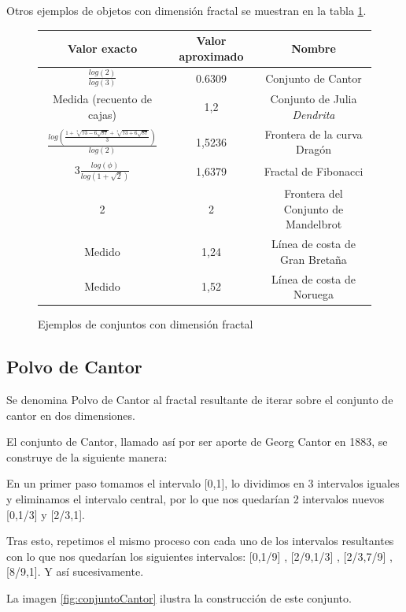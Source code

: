 Otros ejemplos de objetos con dimensión fractal se muestran en la tabla \ref{tab:ejemplos}.

\begin{figure}[hbtp]
\footnotesize
\begin{tabular}{ |c|c|c|}
  \hline
  \textbf{Valor exacto} & \textbf{Valor aproximado} & \textbf{Nombre} 	\\\hline
  $\frac{log(2)}{log(3)}$ & 0.6309 & Conjunto de Cantor \\
  Medida (recuento de cajas) & 1,2 & Conjunto de Julia \emph{Dendrita} \\
  $\frac{log(\frac{1+\sqrt[3]{73-6\sqrt{87}}+\sqrt[3]{73+6\sqrt{87}}}{3})}{log(2)}$ & 1,5236 & Frontera de la curva Dragón \\
  $3\frac{log(\phi)}{log(1+\sqrt{2})}$ & 1,6379 & Fractal de Fibonacci \\
  2 & 2 & Frontera del Conjunto de Mandelbrot \\
  Medido & 1,24 & Línea de costa de Gran Bretaña \\
  Medido & 1,52 & Línea de costa de Noruega \\
  \hline
\end{tabular}
\normalsize
\caption{Ejemplos de conjuntos con dimensión fractal}
\label{tab:ejemplos}
\end{figure}

\subsection{Polvo de Cantor}

\begin{definition}
Se denomina Polvo de Cantor al fractal resultante de iterar sobre el conjunto de cantor en dos dimensiones.
\end{definition}

\begin{definition}
El conjunto de Cantor, llamado así por ser aporte de Georg Cantor en 1883, se construye de la siguiente manera:

En un primer paso tomamos el intervalo [0,1], lo dividimos en 3 intervalos iguales y eliminamos el intervalo central, por lo que nos quedarían 2 intervalos nuevos [0,1/3] y [2/3,1].

Tras esto, repetimos el mismo proceso con cada uno de los intervalos resultantes con lo que nos quedarían los siguientes intervalos: [0,1/9] , [2/9,1/3] , [2/3,7/9] , [8/9,1]. Y así sucesivamente.

La imagen \ref{fig:conjuntoCantor} ilustra la construcción de este conjunto.
\end{definition}

